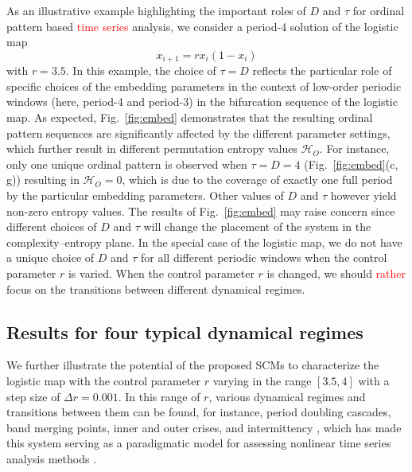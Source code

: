 \documentclass[aip,cha,reprint,nofootinbib]{revtex4-1}
\begin{document}
As an illustrative example highlighting the important roles of $D$ and $\tau$ for ordinal pattern based \textcolor{red}{time series} analysis, we consider a period-4 solution of the logistic map 
\begin{equation}
x_{i+1}=rx_i(1-x_i) 
\end{equation}
\noindent
with $r= 3.5$. {\color{red}In this example, the choice of $\tau = D$ reflects the particular role of specific choices of the embedding parameters in the context of low-order periodic windows (here, period-4 and period-3) in the bifurcation sequence of the logistic map. As expected,} Fig.~\ref{fig:embed} demonstrates that the resulting ordinal pattern sequences are significantly affected by the different parameter settings, which further result in different permutation entropy values $\mathcal{H}_O$. For instance, only one unique ordinal pattern is observed when $\tau = D = 4$ (Fig.~\ref{fig:embed}(c, g)) resulting in $\mathcal{H}_O = 0$, which is due to the coverage of exactly one full period by the particular embedding parameters. Other values of $D$ and $\tau$ however yield non-zero entropy values. The results of Fig.~\ref{fig:embed} may raise concern since different choices of $D$ and $\tau$ will change the placement of the system in the complexity--entropy plane. %
In the special case of the logistic map, we do not have a unique choice of $D$ and $\tau$ for {\color{red}all different} periodic windows when the control parameter $r$ is varied. When the control parameter $r$ is changed, we should \textcolor{red}{rather} focus on the transitions between different dynamical regimes. 

\subsection{Results for four typical dynamical regimes} \label{sec:four}
We further illustrate the potential of the proposed SCMs to characterize the logistic map with the control parameter $r$ varying in the range $[3.5, 4]$ with a step size of $\Delta r = 0.001$. In this range of $r$, various dynamical regimes and transitions between them can be found, for instance, period doubling cascades, band merging points, inner and outer crises, and intermittency \cite{Kantz97}, which has made this system serving as a paradigmatic model for assessing nonlinear time series analysis methods \cite{MarwanPLA2009}. 
\end{document}
